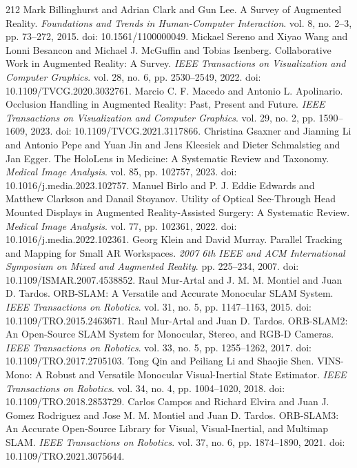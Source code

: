 \begin{thebibliography}{212}
 Mark Billinghurst and Adrian Clark and Gun Lee. A Survey of Augmented Reality. \emph{Foundations and Trends in Human-Computer Interaction}. vol. 8, no. 2--3, pp. 73--272, 2015. doi: 10.1561/1100000049.
 Mickael Sereno and Xiyao Wang and Lonni Besancon and Michael J. McGuffin and Tobias Isenberg. Collaborative Work in Augmented Reality: A Survey. \emph{IEEE Transactions on Visualization and Computer Graphics}. vol. 28, no. 6, pp. 2530--2549, 2022. doi: 10.1109/TVCG.2020.3032761.
 Marcio C. F. Macedo and Antonio L. Apolinario. Occlusion Handling in Augmented Reality: Past, Present and Future. \emph{IEEE Transactions on Visualization and Computer Graphics}. vol. 29, no. 2, pp. 1590--1609, 2023. doi: 10.1109/TVCG.2021.3117866.
 Christina Gsaxner and Jianning Li and Antonio Pepe and Yuan Jin and Jens Kleesiek and Dieter Schmalstieg and Jan Egger. The HoloLens in Medicine: A Systematic Review and Taxonomy. \emph{Medical Image Analysis}. vol. 85, pp. 102757, 2023. doi: 10.1016/j.media.2023.102757.
 Manuel Birlo and P. J. Eddie Edwards and Matthew Clarkson and Danail Stoyanov. Utility of Optical See-Through Head Mounted Displays in Augmented Reality-Assisted Surgery: A Systematic Review. \emph{Medical Image Analysis}. vol. 77, pp. 102361, 2022. doi: 10.1016/j.media.2022.102361.
 Georg Klein and David Murray. Parallel Tracking and Mapping for Small {AR} Workspaces. \emph{2007 6th IEEE and ACM International Symposium on Mixed and Augmented Reality}. pp. 225--234, 2007. doi: 10.1109/ISMAR.2007.4538852.
 Raul Mur-Artal and J. M. M. Montiel and Juan D. Tardos. {ORB-SLAM}: A Versatile and Accurate Monocular {SLAM} System. \emph{IEEE Transactions on Robotics}. vol. 31, no. 5, pp. 1147--1163, 2015. doi: 10.1109/TRO.2015.2463671.
 Raul Mur-Artal and Juan D. Tardos. {ORB-SLAM2}: An Open-Source {SLAM} System for Monocular, Stereo, and {RGB-D} Cameras. \emph{IEEE Transactions on Robotics}. vol. 33, no. 5, pp. 1255--1262, 2017. doi: 10.1109/TRO.2017.2705103.
 Tong Qin and Peiliang Li and Shaojie Shen. {VINS-Mono}: A Robust and Versatile Monocular Visual-Inertial State Estimator. \emph{IEEE Transactions on Robotics}. vol. 34, no. 4, pp. 1004--1020, 2018. doi: 10.1109/TRO.2018.2853729.
 Carlos Campos and Richard Elvira and Juan J. Gomez Rodriguez and Jose M. M. Montiel and Juan D. Tardos. {ORB-SLAM3}: An Accurate Open-Source Library for Visual, Visual-Inertial, and Multimap {SLAM}. \emph{IEEE Transactions on Robotics}. vol. 37, no. 6, pp. 1874--1890, 2021. doi: 10.1109/TRO.2021.3075644.

\end{thebibliography}
